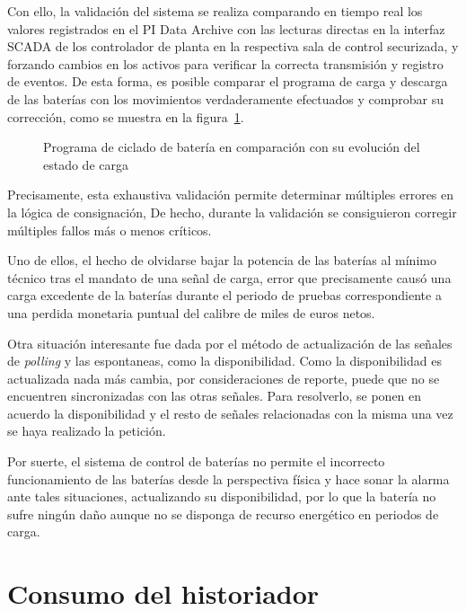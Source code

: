 Con ello, la validación del sistema se realiza comparando en tiempo real los valores registrados en el PI Data Archive con las lecturas directas en la interfaz SCADA de los controlador de planta en la respectiva sala de control securizada, y forzando cambios en los activos para verificar la correcta transmisión y registro de eventos. De esta forma, es posible comparar el programa de carga y descarga de las baterías con los movimientos verdaderamente efectuados y comprobar su corrección, como se muestra en la figura~\ref{fig:programa-batería}.

\begin{figure}
\centering
\caption{Programa de ciclado de batería en comparación con su evolución del estado de carga}
\label{fig:programa-batería}
\end{figure}

Precisamente, esta exhaustiva validación permite determinar múltiples errores en la lógica de consignación, De hecho, durante la validación se consiguieron corregir múltiples fallos más o menos críticos.

Uno de ellos, el hecho de olvidarse bajar la potencia de las baterías al mínimo técnico tras el mandato de una señal de carga, error que precisamente causó una carga excedente de la baterías durante el periodo de pruebas correspondiente a una perdida monetaria puntual del calibre de miles de euros netos.

Otra situación interesante fue dada por el método de actualización de las señales de \textit{polling} y las espontaneas, como la disponibilidad. Como la disponibilidad es actualizada nada más cambia, por consideraciones de reporte, puede que no se encuentren sincronizadas con las otras señales. Para resolverlo, se ponen en acuerdo la disponibilidad y el resto de señales relacionadas con la misma una vez se haya realizado la petición.

Por suerte, el sistema de control de baterías no permite el incorrecto funcionamiento de las baterías desde la perspectiva física y hace sonar la alarma ante tales situaciones, actualizando su disponibilidad, por lo que la batería no sufre ningún daño aunque no se disponga de recurso energético en periodos de carga.

\section{Consumo del historiador}
\label{makereference3.5}

